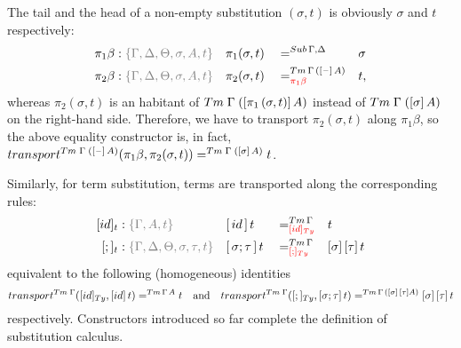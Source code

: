 \documentclass[a4paper,UKenglish,numberwithinsect,cleveref,thm-restate]{lipics-v2021}
\begin{document}
The tail and the head of a non-empty substitution $(\sigma, t)$ is obviously $\sigma$ and $t$ respectively:
\begin{alignat*}{5}
  \pi_1\beta      & : \implicit{\Gamma, \Delta, \Theta, \sigma, A, t} && \pi_1(\sigma , t)        && =^{\Sub\,\Gamma,\Delta} &&  \sigma \\
  \pi_2\beta      & : \implicit{\Gamma, \Delta, \Theta, \sigma, A, t} && \pi_2(\sigma , t)        && =^{\Tm\,\Gamma\,([\blank]\,A)}_{\alert{\pi_1\beta}} &&  t, 
\end{alignat*}
whereas $\pi_2(\sigma, t)$ is an habitant of $\Tm\;\Gamma\;([\pi_1\,(\sigma, t)]\,A)$ instead of $\Tm\;\Gamma\;([\sigma]\,A)$ on the right-hand side. 
Therefore, we have to transport $\pi_2(\sigma, t)$ along $\pi_1\beta$, so the above equality constructor is, in fact, $\transfib{\Tm\;\Gamma\;([\blank]\,A)}{\pi_1\beta}{\pi_2(\sigma, t)} =^{\Tm\;\Gamma\;([\sigma]\,A)} t$.

Similarly, for term substitution, terms are transported along the corresponding rules:
\begin{alignat*}{5}
  [\idS]_t         & : \implicit{\Gamma, A, t} && {[\,\idS\,]\,t}         && =^{\Tm\,\Gamma}_{\alert{[\idS]_\Ty}}  && t \\
  [;]_t            & : \implicit{\Gamma, \Delta, \Theta, \sigma, \tau, t} && {[\,\sigma ; \tau\,]\,t} && =^{\Tm\,\Gamma}_{\alert{[;]_{\Ty}}}   && {[ \sigma ]\,[ \tau ]\,t} \\
\end{alignat*}
equivalent to the following (homogeneous) identities
\[
  \transfib{\Tm\;\Gamma}{[\idS]_{\Ty}}{[\idS]\,t} =^{\Tm\,\Gamma\,A} t
  \quad\text{and}\quad
  \transfib{\Tm\;\Gamma}{[;]_{\Ty}}{[\sigma;\tau]\,t} =^{\Tm\,\Gamma\,([\sigma]\,[\tau]A)} [\sigma]\,[\tau]\,t
\]
respectively.
Constructors introduced so far complete the definition of substitution calculus.
\end{document}
